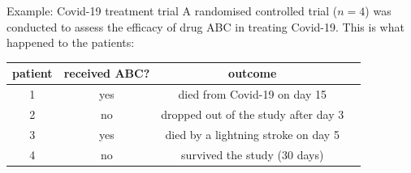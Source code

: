 \begin{frame}{Example: Covid-19 treatment trial}
    A randomised controlled trial ($n=4$) was conducted to assess the efficacy of drug ABC in treating Covid-19.
    This is what happened to the patients:
    \pause\bigskip

    \begin{tabular}{c|c|cl}
        patient & received ABC? & outcome \\
        \hline
        1 & yes & died from Covid-19 on day 15 \\
        2 & no & dropped out of the study after day 3 \\
        3 & yes & died by a lightning stroke on day 5 \\
        4 & no & survived the study (30 days) \\
    \end{tabular}
\end{frame}
